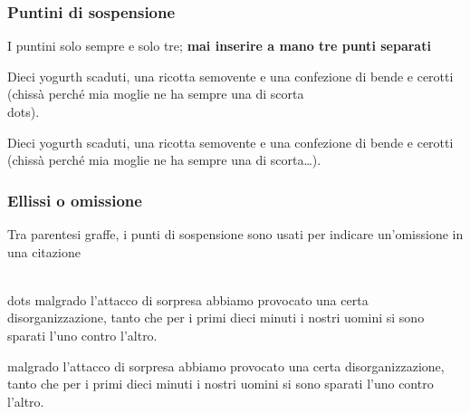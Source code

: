 \documentclass[svgnames,%
	ucs,%
	pdftex]{guitbeamer}
\begin{document}
\begin{frame}
  \frametitle{Puntini di sospensione}
	I puntini solo sempre e solo tre; \textbf{mai inserire a mano tre punti
	separati}
	\begin{LaTeXcode}
		Dieci yogurth scaduti, una ricotta semovente e una confezione di
		bende e cerotti (chiss\`a perch\'e mia moglie ne ha sempre una di
		scorta\alert{\\dots}). 
	\end{LaTeXcode}
	\begin{LaTeXoutput}
		Dieci yogurth scaduti, una ricotta semovente e una confezione di
		bende e cerotti (chiss\`a perch\'e mia moglie ne ha sempre una di
		scorta\dots).
	\end{LaTeXoutput}
\end{frame}
\begin{frame}
  \frametitle{Ellissi o omissione}
	Tra parentesi graffe, i punti di sospensione sono usati per indicare
	un'omissione in una citazione
	\begin{LaTeXcode}
		\alert{\ls\\dots\rs} malgrado l'attacco di sorpresa abbiamo
		provocato una certa disorganizzazione, tanto che per i primi dieci
		minuti i nostri uomini si sono sparati l'uno contro l'altro. 
	\end{LaTeXcode}
	\begin{LaTeXoutput}[]
		[\dots] malgrado l'attacco di sorpresa abbiamo provocato una certa
		disorganizzazione, tanto che per i primi dieci minuti i nostri
		uomini si sono sparati l'uno contro l'altro.
	\end{LaTeXoutput}
\end{frame}
\end{document}
